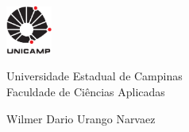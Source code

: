 





\thispagestyle{empty}

\begin{minipage}{.2\textwidth}
	\includegraphics[width=1.5cm]{img/unicamp.pdf}
\end{minipage}
\hspace*{\fill}
\begin{minipage}{.7\textwidth}
	{\large Universidade Estadual de Campinas\\
		Faculdade de Ciências Aplicadas}
\end{minipage}
\vspace*{1.5cm}

\begin{center}
	\large Wilmer Dario Urango Narvaez
\end{center}

